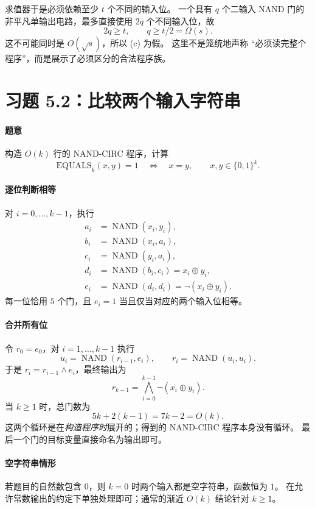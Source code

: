 \documentclass[UTF8,fontset=fandol,11pt,a4paper]{ctexart}
\newcommand{\bits}{\{0,1\}}
\newcommand{\NAND}{\operatorname{NAND}}
\begin{document}
求值器于是必须依赖至少 $t$ 个不同的输入位。
一个具有 $q$ 个二输入 NAND 门的非平凡单输出电路，最多直接使用 $2q$ 个不同输入位，故
\[
 2q\ge t,\qquad q\ge t/2=\Omega(s).
\]
这不可能同时是 $O(\sqrt s)$，所以 (c) 为假。
这里不是笼统地声称 ``必须读完整个程序''，而是展示了必须区分的合法程序族。

\section{习题 5.2：比较两个输入字符串}

\paragraph{题意}
构造 $O(k)$ 行的 NAND-CIRC 程序，计算
\[
 \mathrm{EQUALS}_k(x,y)=1\quad\Longleftrightarrow\quad x=y,
 \qquad x,y\in\bits^k.
\]

\paragraph{逐位判断相等}
对 $i=0,\ldots,k-1$，执行
\begin{align*}
 a_i&=\NAND(x_i,y_i),\\
 b_i&=\NAND(x_i,a_i),\\
 c_i&=\NAND(y_i,a_i),\\
 d_i&=\NAND(b_i,c_i)=x_i\oplus y_i,\\
 e_i&=\NAND(d_i,d_i)=\neg(x_i\oplus y_i).
\end{align*}
每一位恰用 $5$ 个门，且 $e_i=1$ 当且仅当对应的两个输入位相等。

\paragraph{合并所有位}
令 $r_0=e_0$，对 $i=1,\ldots,k-1$ 执行
\[
 u_i=\NAND(r_{i-1},e_i),\qquad r_i=\NAND(u_i,u_i).
\]
于是 $r_i=r_{i-1}\land e_i$，最终输出为
\[
 r_{k-1}=\bigwedge_{i=0}^{k-1}\neg(x_i\oplus y_i).
\]
当 $k\ge1$ 时，总门数为
\[
 5k+2(k-1)=7k-2=O(k).
\]
这两个循环是在\emph{构造程序时}展开的；得到的 NAND-CIRC 程序本身没有循环。
最后一个门的目标变量直接命名为输出即可。

\paragraph{空字符串情形}
若题目的自然数包含 $0$，则 $k=0$ 时两个输入都是空字符串，函数恒为 $1$。
在允许常数输出的约定下单独处理即可；通常的渐近 $O(k)$ 结论针对 $k\ge1$。
\end{document}
